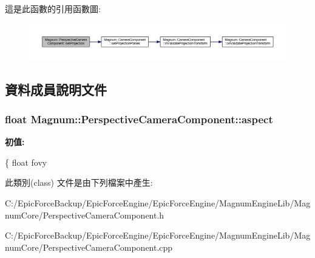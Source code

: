 這是此函數的引用函數圖\+:\nopagebreak
\begin{figure}[H]
\begin{center}
\leavevmode
\includegraphics[width=350pt]{class_magnum_1_1_perspective_camera_component_a4a3cc80a282ec870cb1343952b391940_cgraph}
\end{center}
\end{figure}




\subsection{資料成員說明文件}
\subsubsection[{\texorpdfstring{aspect}{aspect}}]{\setlength{\rightskip}{0pt plus 5cm}float Magnum\+::\+Perspective\+Camera\+Component\+::aspect}\hypertarget{class_magnum_1_1_perspective_camera_component_a51c41ab2aa5d147f0dbee655dad87da2}{}\label{class_magnum_1_1_perspective_camera_component_a51c41ab2aa5d147f0dbee655dad87da2}
{\bfseries 初值\+:}
\begin{DoxyCode}
\{
            \textcolor{keywordtype}{float} fovy
\end{DoxyCode}


此類別(class) 文件是由下列檔案中產生\+:\begin{DoxyCompactItemize}
\item 
C\+:/\+Epic\+Force\+Backup/\+Epic\+Force\+Engine/\+Epic\+Force\+Engine/\+Magnum\+Engine\+Lib/\+Magnum\+Core/Perspective\+Camera\+Component.\+h\item 
C\+:/\+Epic\+Force\+Backup/\+Epic\+Force\+Engine/\+Epic\+Force\+Engine/\+Magnum\+Engine\+Lib/\+Magnum\+Core/Perspective\+Camera\+Component.\+cpp\end{DoxyCompactItemize}
